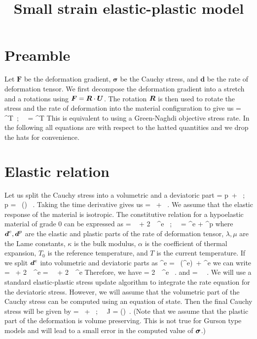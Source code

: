 
\title{Small strain elastic-plastic model}

\maketitle
\tableofcontents
\section{Preamble}
Let $\boldsymbol{F}$ be the deformation gradient, $\boldsymbol{\sigma}$ be the 
Cauchy stress, and $\boldsymbol{d}$ be the rate of deformation tensor.  We
first decompose the deformation gradient into a stretch and a rotations using
$\BF = \BR\cdot\BU$.  The rotation $\BR$ is then used to rotate the stress and
the rate of deformation into the material configuration to give us
\Beq
  \widehat{\Bsig} = \BR^T\cdot\Bsig\cdot\BR ~;~~
  \widehat{\Bd} = \BR^T\cdot\Bd\cdot\BR 
\Eeq
This is equivalent to using a Green-Naghdi objective stress rate.  In the 
following all equations are with respect to the hatted quantities and we 
drop the hats for convenience.

\section{Elastic relation}
Let us split the Cauchy stress into a volumetric and a deviatoric part
\Beq
  \Bsig = p~\Bone + \Bs ~;~~ p = \Third~\Tr(\Bsig) ~.
\Eeq
Taking the time derivative gives us
\Beq
  \dot{\Bsig} = ~\Bone + \dot{\Bs} ~.
\Eeq
We assume that the elastic response of the material is isotropic.  The constitutive 
relation for a hypoelastic material of grade 0 can be expressed as
\Beq
  \dot{\Bsig} = ~\Bone 
    + 2~\mu~\Bd^e  ~;~~ \Bd = \Bd^e + \Bd^p
\Eeq
where $\Bd^e, \Bd^p$ are the elastic and plastic parts of the rate of deformation 
tensor, $\lambda,\mu$ are the Lame constants, $\kappa$ is the bulk modulus, $\alpha$
is the coefficient of thermal expansion, $T_0$ is the reference temperature, and $T$ is the
current temperature.  If we split $\Bd^e$ into volumetric and deviatoric parts as
\Beq
  \Bd^e = \Third~\Tr(\Bd^e)~\Bone + \Beta^e
\Eeq
we can write
\Beq
  \dot{\Bsig} = ~\Bone + 2~\mu~\Beta^e  =
  \kappa~~\Bone + 2~\mu~\Beta^e  
\Eeq
Therefore, we have
\Beq
  \dot{\Bs} = 2~\mu~\Beta^e ~.
\Eeq
and
\Beq
   = \kappa~ ~.
\Eeq
We will use a standard elastic-plastic stress update algorithm to integrate the rate 
equation for the deviatoric stress.  However, we will assume that the volumetric part 
of the Cauchy stress can be computed using an equation of state.  Then the final
Cauchy stress will be given by
\Beq
  \Bsig = ~\Bone + \Bs ~;~~ 
  J = \det(\BF)~.
\Eeq
(Note that we assume that the plastic part of the deformation is volume preserving.
This is not true for Gurson type models and will lead to a small error in the 
computed value of $\Bsig$.)

